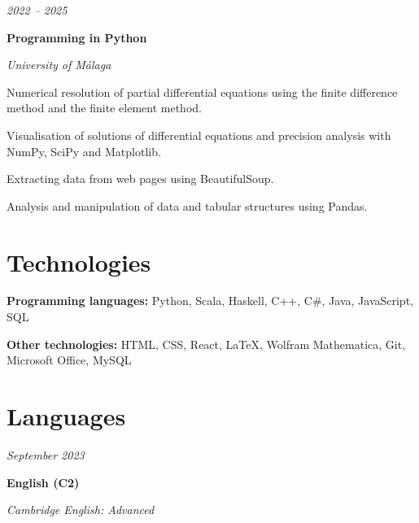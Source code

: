 \documentclass[10pt, letterpaper]{article}
\begin{document}
        \begin{twocolentry}{
            
        \textit{2022 – 2025}}
            \textbf{Programming in Python}

            \textit{University of Málaga}
        \end{twocolentry}

        \vspace{0.10 cm}
        \begin{onecolentry}
            \begin{highlights}
                \item Numerical resolution of partial differential equations using the finite difference method and the finite element method.
                \item Visualisation of solutions of differential equations and precision analysis with NumPy, SciPy and Matplotlib.
                \item Extracting data from web pages using BeautifulSoup.
                \item Analysis and manipulation of data and tabular structures using Pandas.
            \end{highlights}
        \end{onecolentry}

    \section{Technologies}

        \begin{onecolentry}
            \textbf{Programming languages:} Python, Scala, Haskell, C++, C\#, Java, JavaScript, SQL
        \end{onecolentry}

        \vspace{0.2 cm}

        \begin{onecolentry}
            \textbf{Other technologies:} HTML, CSS, React, LaTeX, Wolfram Mathematica, Git, Microsoft Office, MySQL
        \end{onecolentry}

    \section{Languages}

        \begin{twocolentry}{
            
        \textit{September 2023}}
            \textbf{English (C2)}

            \textit{Cambridge English: Advanced}
        \end{twocolentry}
\end{document}
